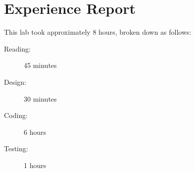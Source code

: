 \documentclass[11pt, titlepage]{article}
\begin{document}
    \section{Experience Report}
        This lab took approximately 8 hours, broken down as follows:
        \begin{description}
            \item[Reading:] 45 minutes
            \item[Design:] 30 minutes
            \item[Coding:] 6 hours
            \item[Testing:] 1 hours
        \end{description}   
        
\end{document}

